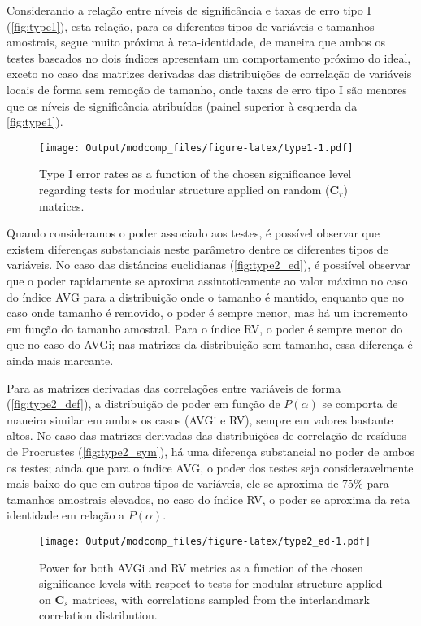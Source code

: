 \documentclass[11pt,]{article}
\begin{document}
Considerando a relação entre níveis de significância e taxas de erro
tipo I (\autoref{fig:type1}), esta relação, para os diferentes tipos de
variáveis e tamanhos amostrais, segue muito próxima à reta-identidade,
de maneira que ambos os testes baseados no dois índices apresentam um
comportamento próximo do ideal, exceto no caso das matrizes derivadas
das distribuições de correlação de variáveis locais de forma sem remoção
de tamanho, onde taxas de erro tipo I são menores que os níveis de
significância atribuídos (painel superior à esquerda da
\autoref{fig:type1}).

\begin{figure}[htbp]
\centering
\texttt{[image: Output/modcomp\_files/figure-latex/type1-1.pdf]}
\caption{Type I error rates as a function of the chosen significance
level regarding tests for modular structure applied on random
($\mathbf{C}_r$) matrices. \label{fig:type1}}
\end{figure}

Quando consideramos o poder associado aos testes, é possível observar
que existem diferenças substanciais neste parâmetro dentre os diferentes
tipos de variáveis. No caso das distâncias euclidianas
(\autoref{fig:type2_ed}), é possiível observar que o poder rapidamente
se aproxima assintoticamente ao valor máximo no caso do índice AVG para
a distribuição onde o tamanho é mantido, enquanto que no caso onde
tamanho é removido, o poder é sempre menor, mas há um incremento em
função do tamanho amostral. Para o índice RV, o poder é sempre menor do
que no caso do AVGi; nas matrizes da distribuição sem tamanho, essa
diferença é ainda mais marcante.

Para as matrizes derivadas das correlações entre variáveis de forma
(\autoref{fig:type2_def}), a distribuição de poder em função de
$P(\alpha)$ se comporta de maneira similar em ambos os casos (AVGi e
RV), sempre em valores bastante altos. No caso das matrizes derivadas
das distribuições de correlação de resíduos de Procrustes
(\autoref{fig:type2_sym}), há uma diferença substancial no poder de
ambos os testes; ainda que para o índice AVG, o poder dos testes seja
consideravelmente mais baixo do que em outros tipos de variáveis, ele se
aproxima de 75\% para tamanhos amostrais elevados, no caso do índice RV,
o poder se aproxima da reta identidade em relação a $P(\alpha)$.

\begin{figure}[htbp]
\centering
\texttt{[image: Output/modcomp\_files/figure-latex/type2\_ed-1.pdf]}
\caption{Power for both AVGi and RV metrics as a function of the chosen
significance levels with respect to tests for modular structure applied
on $\mathbf{C}_s$ matrices, with correlations sampled from the
interlandmark correlation distribution. \label{fig:type2_ed}}
\end{figure}
\end{document}
